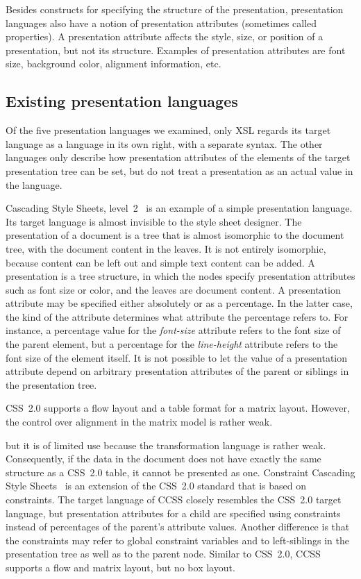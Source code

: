 Besides constructs for specifying the structure of the presentation, presentation languages also have a notion of presentation attributes (sometimes called properties). A presentation attribute affects the style, size, or position of a presentation, but not its structure. Examples of presentation attributes are font size, background color, alignment information, etc.


%																
\subsection{Existing presentation languages} \label{sect:existingtarget}

Of the five presentation languages we examined, only XSL regards its target language as a language in its own right, with a separate syntax. The other languages only describe how presentation attributes of the elements of the target presentation tree can be set, but do not treat a presentation as an actual value in the language.

 Cascading Style Sheets, level~2~\cite{css2} is an example of a simple presentation language. Its target language is almost invisible to the style sheet designer.  \bc The presentation of a document is a tree that is almost isomorphic to the document tree, with the document content in the leaves. It is not entirely isomorphic, because content can be left out and simple text content can be added.  \ec A presentation is a tree structure, in which the nodes specify presentation attributes such as font size or color, and the leaves are document content. A presentation attribute may be specified either absolutely or as a percentage. In the latter case, the kind of the attribute determines what attribute the percentage refers to. For instance, a percentage value for the {\em font-size} attribute refers to the font size of the parent element, but a percentage for the {\em line-height} attribute refers to the font size of the element itself. It is not possible to let the value of a presentation attribute depend on arbitrary presentation attributes of the parent or siblings in the presentation tree.

CSS~2.0 supports a flow layout and a table format for a matrix layout. However, the control over alignment in the matrix model is rather weak.

\bc but it is of limited use because the transformation language is rather weak. Consequently, if the data in the document does not have exactly the same structure as a CSS~2.0 table, it cannot be presented as one.
\ec
{} Constraint Cascading Style Sheets~\cite{badros99ccss} is an extension of the CSS~2.0 standard that is based on constraints. The target language of CCSS closely resembles the CSS~2.0 target language, but presentation attributes for a child are specified using constraints instead of percentages of the parent's attribute values. Another difference is that the constraints may refer to global constraint variables and to left-siblings in the presentation tree as well as to the parent node. Similar to CSS~2.0, CCSS supports a flow and matrix layout, but no box layout.

